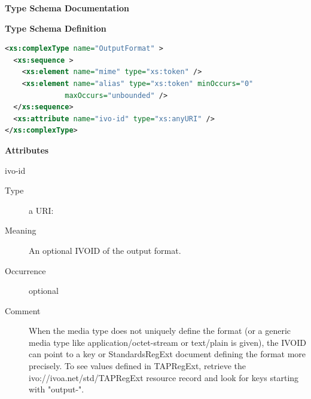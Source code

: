 \documentclass{ivoa}
\begin{document}
\begin{generated}
\begingroup
      	\renewcommand*\descriptionlabel[1]{%
      	\hbox to 5.5em{\emph{#1}\hfil}}\vspace{2ex}\noindent\textbf{ Type Schema Documentation}



\vspace{1ex}\noindent\textbf{ Type Schema Definition}

\begin{lstlisting}[language=XML,basicstyle=\footnotesize]
<xs:complexType name="OutputFormat" >
  <xs:sequence >
    <xs:element name="mime" type="xs:token" />
    <xs:element name="alias" type="xs:token" minOccurs="0"
              maxOccurs="unbounded" />
  </xs:sequence>
  <xs:attribute name="ivo-id" type="xs:anyURI" />
</xs:complexType>
\end{lstlisting}

\vspace{0.5ex}\noindent\textbf{ Attributes}

\begingroup\small\begin{bigdescription}
\item[ivo-id]
\begin{description}
\item[Type] a URI: 
\item[Meaning] 
        An optional IVOID of the output format.
        
\item[Occurrence] optional
\item[Comment] 
          When the media type does not uniquely define the
          format (or a generic media type like application/octet-stream or
          text/plain is given), the IVOID can point to a key
          or StandardsRegExt document defining the format more
          precisely.  To see values defined in TAPRegExt,
          retrieve the ivo://ivoa.net/std/TAPRegExt
          resource record and look for keys starting with {"}output-{"}.
        

\end{description}
\end{bigdescription}
\end{generated}
\end{document}
